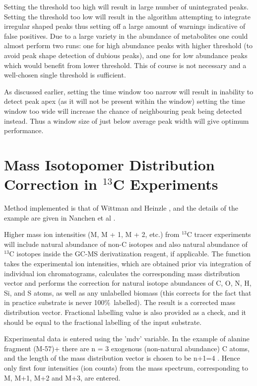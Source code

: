 Setting the threshold too high will result in large number of unintegrated 
peaks. Setting the threshold too low will result in the algorithm attempting 
to integrate irregular shaped peaks thus setting off a large amount of warnings 
indicative of false positives. Due to a large variety in the abundance of 
metabolites one could almost perform two runs: one for high abundance peaks 
with higher threshold (to avoid peak shape detection of dubious peaks), and one 
for low abundance peaks which would benefit from lower threshold. This of course 
is not necessary and a well-chosen single threshold is sufficient. 

As discussed earlier, setting the time window too narrow will result in 
inability to detect peak apex (as it will not be present within the window) 
setting the time window too wide will increase the chance of neighbouring peak 
being detected instead. Thus a window size of just below average peak width will 
give optimum performance.

\section{Mass Isotopomer Distribution Correction in $^{13}$C Experiments}


Method implemented is that of Wittman and Heinzle \cite{wittman99}, and the
details of the example are given in Nanchen et al \cite{nanchen07}. 

Higher mass ion intensities (M, M + 1, M + 2, etc.) from $^{13}$C tracer 
experiments will include natural abundance of non-C isotopes and also natural 
abundance of $^{13}$C isotopes inside the GC-MS derivatization reagent, if 
applicable. The function takes the experimental ion intensities, which are
obtained prior via integration of individual ion chromatograms, calculates
the corresponding mass distribution vector and performs the correction for
natural isotope abundances of C, O, N, H, Si, and S atoms, as well as any
unlabelled biomass (this corrects for the fact that in practice substrate
is never 100\%\ labelled). The result is a corrected mass distribution vector.
Fractional labelling value is also provided as a check, and it should be
equal to the fractional labelling of the input substrate.

Experimental data is entered using the 'mdv' variable. In the example of
alanine fragment (M-57)+ there are n = 3 exogenous (non-natural
abundance) C atoms, and the length of the mass distribution vector
is chosen to be n+1=4 \cite{nanchen07}. Hence only first four intensities 
(ion counts) from the mass spectrum, corresponding to M, M+1, M+2 and M+3, 
are entered.

